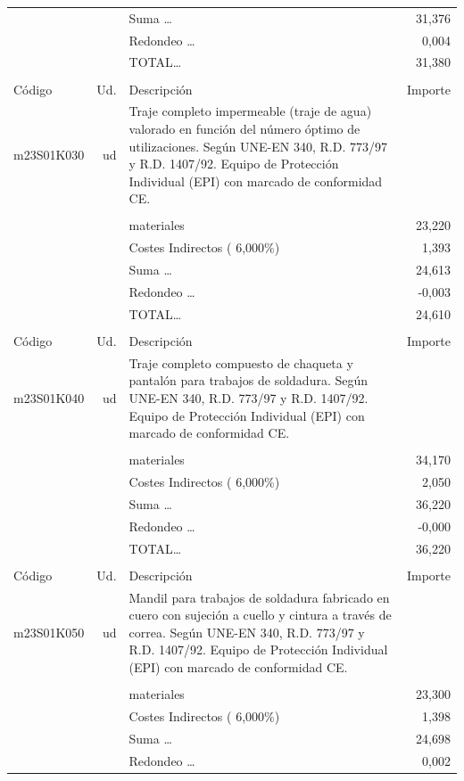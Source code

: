 \begin{supertabular}{l r p{60mm} r}
&&Suma \ldots&    31,376\\%
&&Redondeo \ldots&     0,004\\%
%
&&TOTAL\ldots&    31,380\\%
&&&\\%
Código&Ud.&Descripción&Importe\\%
\hline%
m23S01K030&ud&Traje completo impermeable (traje de agua) valorado en función del número óptimo de utilizaciones. Según UNE{-}EN 340, R.D. 773/97 y R.D. 1407/92. Equipo de Protección Individual (EPI) con marcado de conformidad CE.&\\%
&&&\\%
&&materiales&    23,220\\%
&&Costes Indirectos (     6,000\%)&     1,393\\%
&&Suma \ldots&    24,613\\%
&&Redondeo \ldots&    {-}0,003\\%
%
&&TOTAL\ldots&    24,610\\%
&&&\\%
Código&Ud.&Descripción&Importe\\%
\hline%
m23S01K040&ud&Traje completo compuesto de chaqueta y pantalón para trabajos de soldadura. Según UNE{-}EN 340, R.D. 773/97 y R.D. 1407/92. Equipo de Protección Individual (EPI) con marcado de conformidad CE.&\\%
&&&\\%
&&materiales&    34,170\\%
&&Costes Indirectos (     6,000\%)&     2,050\\%
&&Suma \ldots&    36,220\\%
&&Redondeo \ldots&    {-}0,000\\%
%
&&TOTAL\ldots&    36,220\\%
&&&\\%
Código&Ud.&Descripción&Importe\\%
\hline%
m23S01K050&ud&Mandil para trabajos de soldadura fabricado en cuero con sujeción a cuello y cintura a través de correa. Según UNE{-}EN 340, R.D. 773/97 y R.D. 1407/92. Equipo de Protección Individual (EPI) con marcado de conformidad CE.&\\%
&&&\\%
&&materiales&    23,300\\%
&&Costes Indirectos (     6,000\%)&     1,398\\%
&&Suma \ldots&    24,698\\%
&&Redondeo \ldots&     0,002\\%

\end{supertabular}
